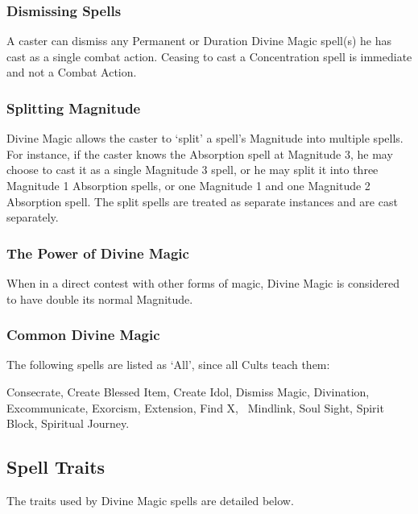 \subsubsection{Dismissing Spells}
A caster can dismiss any Permanent or Duration Divine Magic spell(s) he has cast as a single combat action. Ceasing to cast a Concentration spell is immediate and not a Combat Action.


\subsubsection{Splitting Magnitude}
Divine Magic allows the caster to ‘split’ a spell’s Magnitude into multiple spells. For instance, if the caster knows the Absorption spell at Magnitude 3, he may choose to cast it as a single Magnitude 3 spell, or he may split it into three Magnitude 1 Absorption spells, or one Magnitude 1 and one Magnitude 2 Absorption spell. The split spells are treated as separate instances and are cast separately.

\subsubsection{The Power of Divine Magic}
When in a direct contest with other forms of magic, Divine Magic is considered to have double its normal Magnitude.

\subsubsection{Common Divine Magic}
The following spells are listed as ‘All’, since all Cults teach them:

Consecrate, Create Blessed Item, Create Idol, Dismiss Magic, Divination, Excommunicate, Exorcism, Extension, Find X,  Mindlink, Soul Sight, Spirit Block, Spiritual Journey.


\subsection{Spell Traits}
The traits used by Divine Magic spells are detailed below. 


